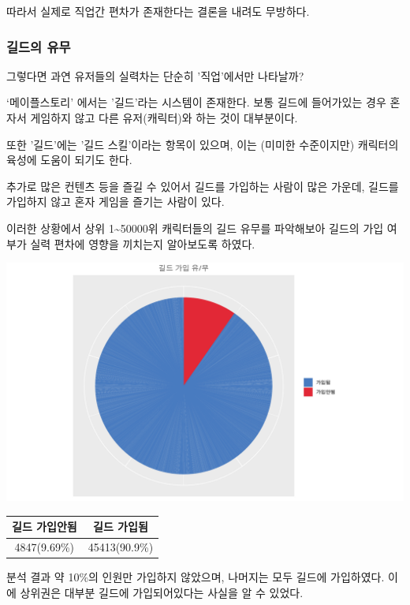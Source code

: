 \documentclass[
]{article}
\begin{document}
따라서 실제로 직업간 편차가 존재한다는 결론을 내려도 무방하다.

\hypertarget{uxae38uxb4dcuxc758-uxc720uxbb34}{%
\subsubsection{길드의 유무}\label{uxae38uxb4dcuxc758-uxc720uxbb34}}

그렇다면 과연 유저들의 실력차는 단순히 '직업'에서만 나타날까?

`메이플스토리' 에서는 '길드'라는 시스템이 존재한다. 보통 길드에
들어가있는 경우 혼자서 게임하지 않고 다른 유저(캐릭터)와 하는 것이
대부분이다.

또한 '길드'에는 '길드 스킬'이라는 항목이 있으며, 이는 (미미한
수준이지만) 캐릭터의 육성에 도움이 되기도 한다.

추가로 많은 컨텐츠 등을 즐길 수 있어서 길드를 가입하는 사람이 많은
가운데, 길드를 가입하지 않고 혼자 게임을 즐기는 사람이 있다.

이러한 상황에서 상위 1\textasciitilde50000위 캐릭터들의 길드 유무를
파악해보아 길드의 가입 여부가 실력 편차에 영향을 끼치는지 알아보도록
하였다.

\includegraphics{123_files/figure-latex/ranking_all_guild-1.pdf}

\begin{longtable}[]{@{}cc@{}}
\toprule()
길드 가입안됨 & 길드 가입됨 \\
\midrule()
\endhead
4847(9.69\%) & 45413(90.9\%) \\
\bottomrule()
\end{longtable}

분석 결과 약 10\%의 인원만 가입하지 않았으며, 나머지는 모두 길드에
가입하였다. 이에 상위권은 대부분 길드에 가입되어있다는 사실을 알 수
있었다.
\end{document}
